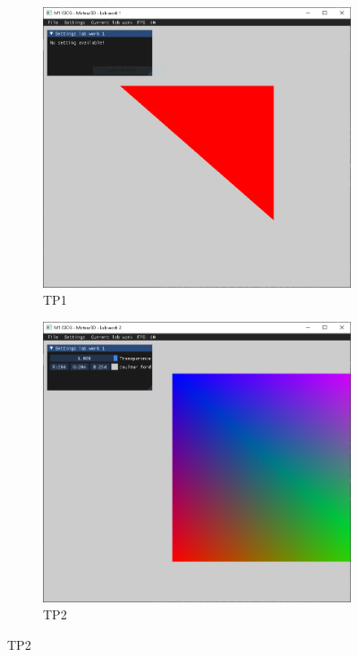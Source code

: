 \documentclass[10pt,a4paper]{article}
\begin{document}
			\begin{figure}[!ht]
				\centering
				\begin{subfigure}[b]{0.32\textwidth}
					\centering
					\includegraphics[width=.9\textwidth]{figures/TP1.png}
					\caption{TP1}\label{fig:TP1}
				\end{subfigure}
				\hfill
				\begin{subfigure}[b]{0.32\textwidth}
					\centering
					\includegraphics[width=.9\textwidth]{figures/TP2.png}
					\caption{TP2}\label{fig:TP2}
				\end{subfigure}

\end{figure}
\end{document}
